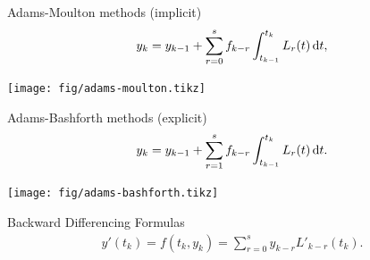 \documentclass[ignorenonframetext,notheorems,aspectratio=1610]{beamer}
\def\lmms{s}
\begin{document}
\begin{frame}
  \begin{block}{Adams-Moulton methods (implicit)}
  \begin{gather*}
    y_k = y_{k-1} + \sum_{r=0}^\lmms f_{k-r} \int_{t_{k-1}}^{t_k}
    L_r(t) \dt,
  \end{gather*}
    \begin{center}
      \texttt{[image: fig/adams-moulton.tikz]}
    \end{center}
        
  \end{block}
\end{frame}
\begin{frame}
  \begin{block}{Adams-Bashforth methods (explicit)}
  \begin{gather*}
    y_k = y_{k-1} + \sum_{r=1}^\lmms f_{k-r} \int_{t_{k-1}}^{t_k}
    L_r(t) \dt.
  \end{gather*}
    \begin{center}
      \texttt{[image: fig/adams-bashforth.tikz]}
    \end{center}
    
  \end{block}
\end{frame}
\begin{frame}
  \begin{block}{Backward Differencing Formulas}
  \begin{gather*}
    y'(t_k) = f(t_k, y_k) = \sum_{r=0}^\lmms y_{k-r} L'_{k-r}(t_k).
  \end{gather*}
    
  \end{block}
\end{frame}

\frame{}
\frame{}
\frame{
}
\frame{}
\frame{
}
\frame{}
\frame{
}
\frame{}
\frame{}
\frame{}
\frame{}
\frame{}
\frame{}
\end{document}
